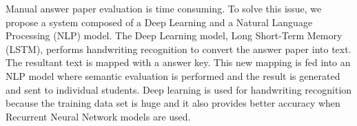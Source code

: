 Manual answer paper evaluation is time consuming. To solve this issue,
we propose a system composed of a Deep Learning and a 
Natural Language Processing (NLP) model.
The Deep Learning model, Long Short-Term Memory (LSTM), performs handwriting recognition to
convert the answer paper into text. The resultant text is mapped
with a answer key. This new mapping is fed into an NLP model where
semantic evaluation is performed and the result is generated and
sent to individual students. Deep learning is used for handwriting 
recognition because the training data set is huge and it also 
provides better accuracy when Recurrent Neural Network models are used. 